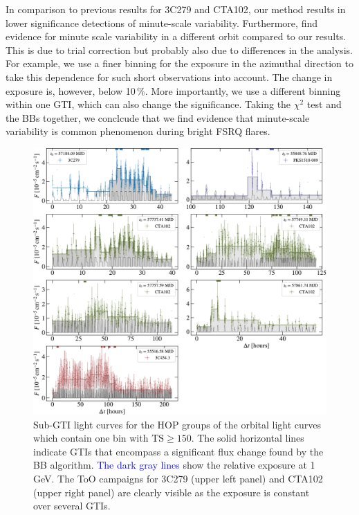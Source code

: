 \documentclass[twocolumn,linenumbers]{aastex62}
\newcommand{\response}[1]{\textcolor{blue}{#1}}
\begin{document}
In comparison to previous results for 3C279 and CTA102, our method results in lower significance detections of minute-scale variability.
Furthermore, \citet{2018ApJ...854L..26S} find evidence for minute scale variability in a different orbit compared to our results.
This is due to trial correction but probably also due to differences in the analysis.
For example, we use a finer binning for the exposure in the azimuthal direction to take this dependence for such short observations into account.
The change in exposure is, however, below 10\,\%.
More importantly, we use a different binning within one GTI, which can also change the significance. 
Taking the $\chi^2$ test and the BBs together, we conclcude that we find evidence that minute-scale variability is common phenomenon during bright FSRQ flares. %
\begin{figure}
    \centering
    \includegraphics[width = .9\linewidth]{lc_minute_3min.pdf}
    \caption{Sub-GTI light curves for the HOP groups of the orbital light curves which contain one bin with $\mathrm{TS} \geqslant 150$. The solid horizontal lines indicate GTIs that encompass a significant flux change found by the BB algorithm. 
    \response{
    The dark gray lines
    }
    show the relative exposure at 1\,GeV. The ToO campaigns for 3C279 (upper left panel) and CTA102 (upper right panel) are clearly visible as the exposure is constant over several GTIs. }
    \label{fig:lc_minutes}
\end{figure}
\end{document}
